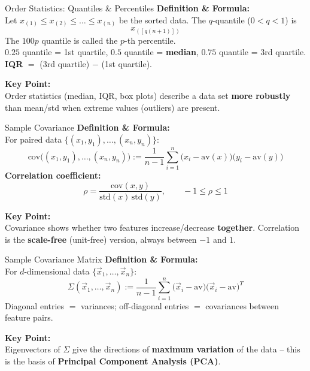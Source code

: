\documentclass{beamer}
\begin{document}
\begin{frame}{Order Statistics: Quantiles \& Percentiles}
\textbf{Definition \& Formula:}\\[0.5mm]
Let $x_{(1)}\le x_{(2)} \le \dots \le x_{(n)}$ be the sorted data. The $q$-quantile ($0<q<1$) is
\[
x_{([q(n+1)])}
\]
The $100p$ quantile is called the $p$-th percentile. \\
$0.25$ quantile = 1st quartile, $0.5$ quantile = \textbf{median}, $0.75$ quantile = 3rd quartile. \\
\textbf{IQR} $=$ (3rd quartile) $-$ (1st quartile).

\vspace{1.5mm}
\textbf{Key Point:}\\[0.5mm]
Order statistics (median, IQR, box plots) describe a data set \textbf{more robustly} than mean/std when extreme values (outliers) are present.
\vspace{1.5mm}
\end{frame}

\begin{frame}{Sample Covariance}
\textbf{Definition \& Formula:}\\[0.5mm]
For paired data $\{(x_1,y_1),\dots,(x_n,y_n)\}$:
\[
\text{cov}\big((x_1,y_1),\dots,(x_n,y_n)\big) := \frac{1}{n-1}\sum_{i=1}^{n} \big(x_i-\text{av}(x)\big)\big(y_i-\text{av}(y)\big)
\]
\textbf{Correlation coefficient:}
\[
\rho = \frac{\text{cov}(x,y)}{\text{std}(x)\,\text{std}(y)}, \qquad -1\le \rho \le 1
\]

\vspace{1.5mm}
\textbf{Key Point:}\\[0.5mm]
Covariance shows whether two features increase/decrease \textbf{together}. Correlation is the \textbf{scale-free} (unit-free) version, always between $-1$ and $1$.
\vspace{1.5mm}
\end{frame}

\begin{frame}{Sample Covariance Matrix}
\textbf{Definition \& Formula:}\\[0.5mm]
For $d$-dimensional data $\{\vec{x}_1,\dots,\vec{x}_n\}$:
\[
\Sigma(\vec{x}_1,\dots,\vec{x}_n) := \frac{1}{n-1}\sum_{i=1}^{n} \big(\vec{x}_i - \text{av}\big)\big(\vec{x}_i - \text{av}\big)^T
\]
Diagonal entries $=$ variances; off-diagonal entries $=$ covariances between feature pairs.

\vspace{1.5mm}
\textbf{Key Point:}\\[0.5mm]
Eigenvectors of $\Sigma$ give the directions of \textbf{maximum variation} of the data -- this is the basis of \textbf{Principal Component Analysis (PCA)}.
\vspace{1.5mm}
\end{frame}
\end{document}

